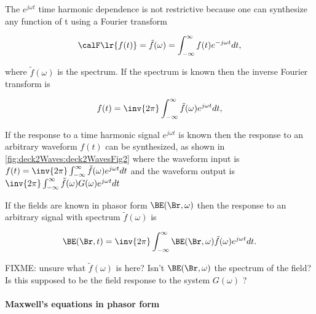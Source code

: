 The \( e^{j \omega t} \) time harmonic dependence is not restrictive because one can synthesize any function of t using a Fourier transform

\begin{equation}\label{eqn:uwavesLecture2:720}
\calF \lr{ f(t) } = \tilde{f}(\omega) = \int_{-\infty}^\infty f(t) e^{-j \omega t} dt,
\end{equation}

where \( \tilde{f}(\omega) \) is the spectrum.  If the spectrum is known then the inverse Fourier transform is

\begin{equation}\label{eqn:uwavesLecture2:740}
f(t) = \inv{2 \pi} \int_{-\infty}^\infty \tilde{f}(\omega) e^{j \omega t} dt,
\end{equation}

If the response to a time harmonic signal \( e^{j \omega t} \) is known then the response to an arbitrary waveform \( f(t) \) can be synthesized, as shown in
\cref{fig:deck2Waves:deck2WavesFig2}
where the waveform input is \( f(t) = \inv{2 \pi} \int_{-\infty}^\infty \tilde{f}(\omega) e^{j \omega t} dt \) and the waveform output is \( \inv{2 \pi} \int_{-\infty}^\infty \tilde{f}(\omega) G(\omega) e^{j \omega t} dt \)


If the fields are known in phasor form \( \BE(\Br, \omega ) \) then the response to an arbitrary signal with spectrum \( \tilde{f}(\omega) \) is

\begin{equation}\label{eqn:uwavesLecture2:760}
\BE(\Br, t ) = \inv{2 \pi} \int_{-\infty}^\infty \BE(\Br, \omega) \tilde{f}(\omega) e^{j \omega t} dt.
\end{equation}

FIXME: unsure what \( \tilde{f}(\omega) \) is here?  Isn't \( \BE(\Br, \omega) \) the spectrum of the field?  Is this supposed to be the field response to the system \( G(\omega) \) ?

\paragraph{Maxwell's equations in phasor form}


